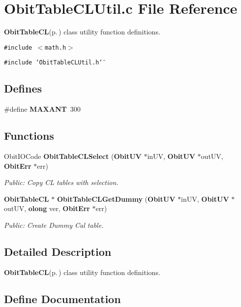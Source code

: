 \section{Obit\-Table\-CLUtil.c File Reference}
\label{ObitTableCLUtil_8c}
{\bf Obit\-Table\-CL}{\rm (p.\,\pageref{structObitTableCL})} class utility function definitions. 

{\tt \#include $<$math.h$>$}\par
{\tt \#include \char`\"{}Obit\-Table\-CLUtil.h\char`\"{}}\par
\subsection*{Defines}
\begin{CompactItemize}
\item 
\#define {\bf MAXANT}\ 300
\end{CompactItemize}
\subsection*{Functions}
\begin{CompactItemize}
\item 
Obit\-IOCode {\bf Obit\-Table\-CLSelect} ({\bf Obit\-UV} $\ast$in\-UV, {\bf Obit\-UV} $\ast$out\-UV, {\bf Obit\-Err} $\ast$err)
\begin{CompactList}\small\item\em Public: Copy CL tables with selection. \item\end{CompactList}\item 
{\bf Obit\-Table\-CL} $\ast$ {\bf Obit\-Table\-CLGet\-Dummy} ({\bf Obit\-UV} $\ast$in\-UV, {\bf Obit\-UV} $\ast$out\-UV, {\bf olong} ver, {\bf Obit\-Err} $\ast$err)
\begin{CompactList}\small\item\em Public: Create Dummy Cal table. \item\end{CompactList}\end{CompactItemize}


\subsection{Detailed Description}
{\bf Obit\-Table\-CL}{\rm (p.\,\pageref{structObitTableCL})} class utility function definitions. 



\subsection{Define Documentation}
